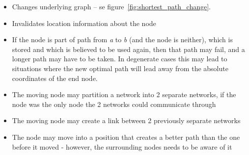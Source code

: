\documentclass[letter, 12pt, english, draft]{article}
\begin{document}
\begin{itemize}
\item Changes underlying graph -- se figure~\ref{fig:shortest_path_change}.
\item Invalidates location information about the node
\item If the node is part of path from \emph{a} to \emph{b} (and the node is neither), which is stored and which is believed to be used again, then that path may fail, and a longer path may have to be taken. In degenerate cases this may lead to situations where the new optimal path will lead away from the absolute coordinates of the end node.
\item The moving node may partition a network into 2 separate networks, if the node was the only node the 2 networks could communicate through
\item The moving node may create a link between 2 previously separate networks
\item The node may move into a position that creates a better path than the one before it moved - however, the surrounding nodes needs to be aware of it
\end{itemize}
\end{document}
